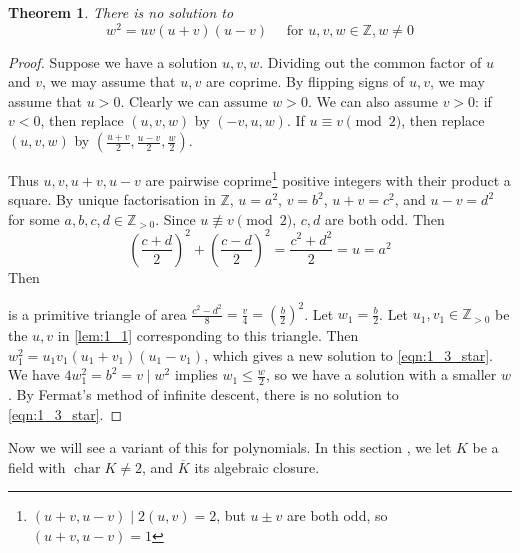 \documentclass[11pt]{article}
\theoremstyle{definition}
\theoremstyle{plain}
\newtheorem{theorem}[definition]{Theorem}
\theoremstyle{remark}
\DeclareMathOperator{\Char}{char}
\newcommand{\ZZ}{\mathbb{Z}}
\begin{document}
\begin{theorem}\label{thm:1_3}
    There is no solution to
    \begin{equation}\label{eqn:1_3_star}
        w^2 = u v (u + v) (u - v) \quad \text{ for } u, v, w \in \ZZ, w \neq 0
    \end{equation}
\end{theorem}
\begin{proof}
    Suppose we have a solution $u, v, w$. Dividing out the common factor of $u$ and $v$, we may assume that $u, v$ are coprime. By flipping signs of $u, v$, we may assume that $u > 0$. Clearly we can assume $w > 0$. We can also assume $v > 0$: if $v < 0$, then replace $(u, v, w)$ by $(-v, u, w)$. If $u \equiv v \pmod{2}$, then replace $(u, v, w)$ by $(\frac{u+v}{2}, \frac{u-v}{2}, \frac{w}{2})$.

    Thus $u, v, u+v, u-v$ are pairwise coprime\footnote{$(u+v, u-v) \mid 2(u, v) = 2$, but $u \pm v$ are both odd, so $(u+v, u-v) = 1$} positive integers with their product a square. By unique factorisation in $\ZZ$, $u = a^2$, $v = b^2$, $u+v = c^2$, and $u-v = d^2$ for some $a, b, c, d \in \ZZ_{>0}$. Since $u \not\equiv v \pmod{2}$, $c, d$ are both odd. Then
    \begin{equation*}
        \left(\frac{c+d}{2}\right)^2 + \left(\frac{c-d}{2}\right)^2 = \frac{c^2 + d^2}{2} = u = a^2
    \end{equation*}
    Then
    \begin{center}
    \end{center}
    is a primitive triangle of area $\frac{c^2 - d^2}{8} = \frac{v}{4} = (\frac{b}{2})^2$. Let $w_1 = \frac{b}{2}$. Let $u_1, v_1 \in \ZZ_{>0}$ be the $u, v$ in \autoref{lem:1_1} corresponding to this triangle. Then $w_1^2 = u_1 v_1 (u_1 + v_1) (u_1 - v_1)$, which gives a new solution to \eqref{eqn:1_3_star}. We have $4 w_1^2 = b^2 = v \mid w^2$ implies $w_1 \le \frac{w}{2}$, so we have a solution with a smaller $w$. By Fermat's method of infinite descent, there is no solution to \eqref{eqn:1_3_star}.
\end{proof}

Now we will see a variant of this for polynomials. In this section , we let $K$ be a field with $\Char K \neq 2$, and $\overline{K}$ its algebraic closure.
\end{document}
